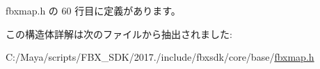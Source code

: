  fbxmap.\+h の 60 行目に定義があります。



この構造体詳解は次のファイルから抽出されました\+:\begin{DoxyCompactItemize}
\item 
C\+:/\+Maya/scripts/\+F\+B\+X\+\_\+\+S\+D\+K/2017./include/fbxsdk/core/base/\hyperlink{fbxmap_8h}{fbxmap.\+h}\end{DoxyCompactItemize}
